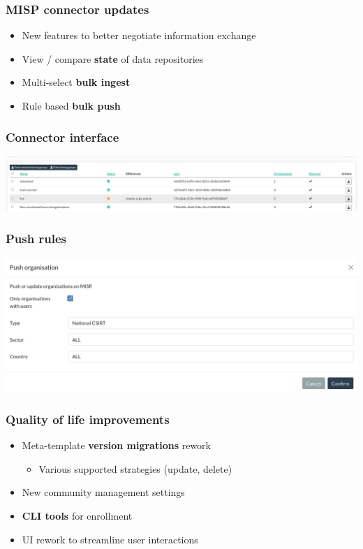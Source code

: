 \begin{frame}
\frametitle{MISP connector updates}
    \begin{itemize}
        \item New features to better negotiate information exchange
        \item View / compare {\bf state} of data repositories
        \item Multi-select {\bf bulk ingest}
        \item Rule based {\bf bulk push}
    \end{itemize}
\end{frame}


\begin{frame}
\frametitle{Connector interface}
    \begin{center}
        \includegraphics[width=1.0\linewidth]{pictures/orchestration2.png}
    \end{center}
\end{frame}

\begin{frame}
\frametitle{Push rules}
    \begin{center}
        \includegraphics[width=1.0\linewidth]{pictures/orchestration3.png}
    \end{center}
\end{frame}

\begin{frame}
\frametitle{Quality of life improvements}
    \begin{itemize}
        \item Meta-template {\bf version migrations} rework
        \begin{itemize}
 	       \item Various supported strategies (update, delete)
        \end{itemize}
        \item New community management settings
        \item {\bf CLI tools} for enrollment
        \item UI rework to streamline user interactions
    \end{itemize}
\end{frame}

